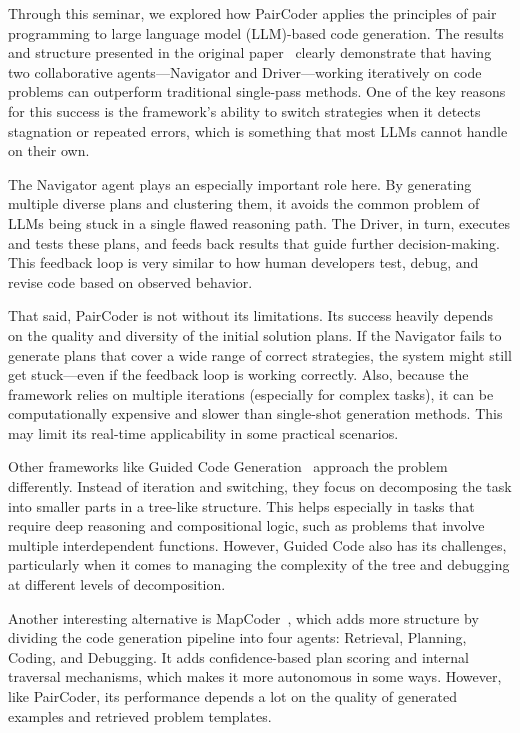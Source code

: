 \documentclass[11pt,a4paper]{article}
\begin{document}
Through this seminar, we explored how PairCoder applies the principles of pair programming to large language model (LLM)-based code generation. The results and structure presented in the original paper~\cite{zhang2024paircoder} clearly demonstrate that having two collaborative agents—Navigator and Driver—working iteratively on code problems can outperform traditional single-pass methods. One of the key reasons for this success is the framework's ability to switch strategies when it detects stagnation or repeated errors, which is something that most LLMs cannot handle on their own.

The Navigator agent plays an especially important role here. By generating multiple diverse plans and clustering them, it avoids the common problem of LLMs being stuck in a single flawed reasoning path. The Driver, in turn, executes and tests these plans, and feeds back results that guide further decision-making. This feedback loop is very similar to how human developers test, debug, and revise code based on observed behavior.

That said, PairCoder is not without its limitations. Its success heavily depends on the quality and diversity of the initial solution plans. If the Navigator fails to generate plans that cover a wide range of correct strategies, the system might still get stuck—even if the feedback loop is working correctly. Also, because the framework relies on multiple iterations (especially for complex tasks), it can be computationally expensive and slower than single-shot generation methods. This may limit its real-time applicability in some practical scenarios.

Other frameworks like Guided Code Generation~\cite{almorsi2025guided} approach the problem differently. Instead of iteration and switching, they focus on decomposing the task into smaller parts in a tree-like structure. This helps especially in tasks that require deep reasoning and compositional logic, such as problems that involve multiple interdependent functions. However, Guided Code also has its challenges, particularly when it comes to managing the complexity of the tree and debugging at different levels of decomposition.

Another interesting alternative is MapCoder~\cite{islam2024mapcodermultiagentcodegeneration}, which adds more structure by dividing the code generation pipeline into four agents: Retrieval, Planning, Coding, and Debugging. It adds confidence-based plan scoring and internal traversal mechanisms, which makes it more autonomous in some ways. However, like PairCoder, its performance depends a lot on the quality of generated examples and retrieved problem templates.
\end{document}
